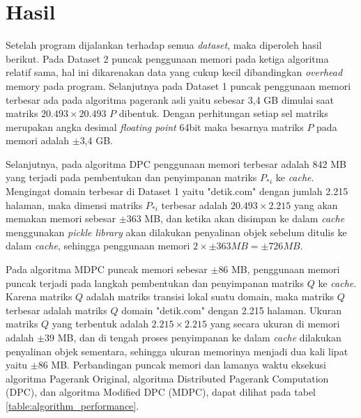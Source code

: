 \section{Hasil}

Setelah program dijalankan terhadap semua \textit{dataset}, maka diperoleh hasil berikut. Pada Dataset 2 puncak penggunaan memori pada ketiga algoritma relatif sama, hal ini dikarenakan data yang cukup kecil dibandingkan \textit{overhead} memory pada program. Selanjutnya pada Dataset 1 puncak penggunaan memori terbesar ada pada algoritma pagerank asli yaitu sebesar 3,4 GB dimulai saat matriks $20.493\times 20.493$ $P$ dibentuk. Dengan perhitungan setiap sel matriks merupakan angka desimal \textit{floating point} 64bit maka besarnya matriks $P$ pada memori adalah $\pm$3,4 GB. 

Selanjutnya, pada algoritma DPC penggunaan memori terbesar adalah 842 MB yang terjadi pada pembentukan dan penyimpanan matriks $P_{*i}$ ke \textit{cache}. Mengingat domain terbesar di Dataset 1 yaitu "detik.com" dengan jumlah 2.215 halaman, maka dimensi matriks $P_{*i}$ terbesar adalah $20.493 \times 2.215$ yang akan memakan memori sebesar $\pm363$ MB, dan ketika akan disimpan ke dalam \textit{cache} menggunakan \textit{pickle library} akan dilakukan penyalinan objek sebelum ditulis ke dalam \textit{cache}, sehingga penggunaan memori $2 \times \pm363 MB = \pm726 MB$. 

Pada algoritma MDPC puncak memori sebesar $\pm86$ MB, penggunaan memori puncak terjadi pada langkah pembentukan dan penyimpanan matriks $Q$ ke \textit{cache}. Karena matriks $Q$ adalah matriks transisi lokal suatu domain, maka matriks $Q$ terbesar adalah matriks $Q$ domain "detik.com" dengan 2.215 halaman. Ukuran matriks $Q$ yang terbentuk adalah $2.215 \times 2.215$ yang secara ukuran di memori adalah $\pm39$ MB, dan di tengah proses penyimpanan ke dalam \textit{cache} dilakukan penyalinan objek sementara, sehingga ukuran memorinya menjadi dua kali lipat yaitu $\pm86$ MB. Perbandingan puncak memori dan lamanya waktu eksekusi algoritma Pagerank Original, algoritma Distributed Pagerank Computation (DPC), dan algoritma Modified DPC (MDPC), dapat dilihat pada tabel \ref{table:algorithm_performance}.


